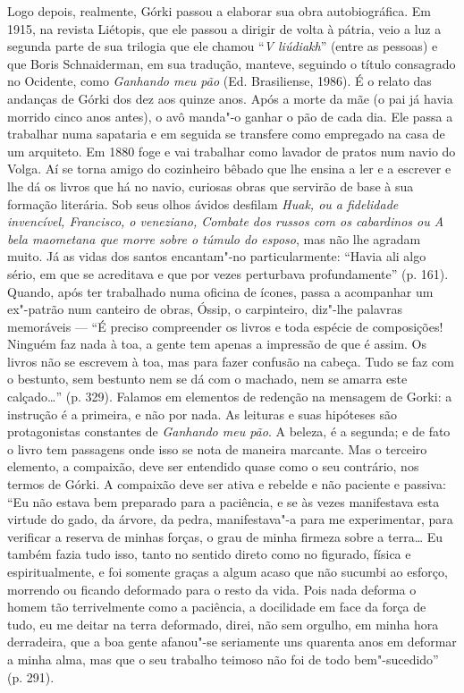 Logo depois, realmente, Górki passou a elaborar sua obra autobiográfica.
Em 1915, na revista Liétopis, que ele passou a dirigir de volta à
pátria, veio a luz a segunda parte de sua trilogia que ele chamou ``\emph{V
liúdiakh}'' (entre as pessoas) e que Boris Schnaiderman, em sua tradução,
manteve, seguindo o título consagrado no Ocidente, como \emph{Ganhando
meu pão} (Ed. Brasiliense, 1986). É o relato das andanças de Górki dos dez aos
quinze anos. Após a morte da mãe (o pai já havia morrido cinco anos
antes), o avô manda"-o ganhar o pão de cada dia. Ele passa a trabalhar
numa sapataria e em seguida se transfere como empregado na casa de um
arquiteto. Em 1880 foge e vai trabalhar como lavador de pratos num navio
do Volga. Aí se torna amigo do cozinheiro bêbado que lhe ensina a ler e
a escrever e lhe dá os livros que há no navio, curiosas obras que
servirão de base à sua formação literária. Sob seus olhos ávidos
desfilam \emph{Huak, ou a fidelidade invencível, Francisco, o veneziano,
Combate dos russos com os cabardinos ou A bela maometana que morre sobre
o túmulo do esposo}, mas não lhe agradam muito. Já as vidas dos santos
encantam"-no particularmente: ``Havia ali algo sério, em que se
acreditava e que por vezes perturbava profundamente'' (p. 161). Quando,
após ter trabalhado numa oficina de ícones, passa a acompanhar um
ex"-patrão num canteiro de obras, Óssip, o carpinteiro, diz"-lhe palavras
memoráveis --- ``É preciso compreender os livros e toda espécie de
composições! Ninguém faz nada à toa, a gente tem apenas a impressão de
que é assim. Os livros não se escrevem à toa, mas para fazer confusão na
cabeça. Tudo se faz com o bestunto, sem bestunto nem se dá com o
machado, nem se amarra este calçado\ldots{}'' (p. 329). Falamos em elementos
de redenção na mensagem de Gorki: a instrução é a primeira, e não por
nada. As leituras e suas hipóteses são protagonistas constantes de
\emph{Ganhando meu pão}. A beleza, é a segunda; e de fato o livro tem
passagens onde isso se nota de maneira marcante. Mas o terceiro
elemento, a compaixão, deve ser entendido quase como o seu contrário,
nos termos de Górki. A compaixão deve ser ativa e rebelde e não paciente
e passiva: ``Eu não estava bem preparado para a paciência, e se às vezes
manifestava esta virtude do gado, da árvore, da pedra, manifestava"-a
para me experimentar, para verificar a reserva de minhas forças, o grau
de minha firmeza sobre a terra\ldots{} Eu também fazia tudo isso, tanto no
sentido direto como no figurado, física e espiritualmente, e foi somente
graças a algum acaso que não sucumbi ao esforço, morrendo ou ficando
deformado para o resto da vida. Pois nada deforma o homem tão
terrivelmente como a paciência, a docilidade em face da força de tudo,
eu me deitar na terra deformado, direi, não sem orgulho, em minha hora
derradeira, que a boa gente afanou"-se seriamente uns quarenta anos em
deformar a minha alma, mas que o seu trabalho teimoso não foi de todo
bem"-sucedido'' (p. 291).


